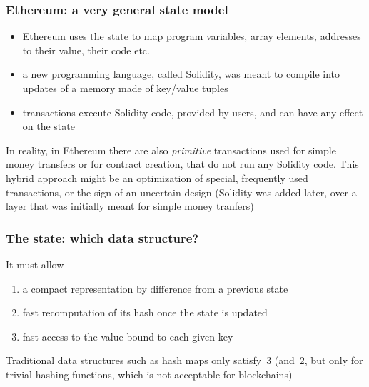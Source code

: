 \documentclass[11pt]{beamer}  %
\begin{document}
\begin{frame}\frametitle{Ethereum: a very general state model}
  \begin{itemize}
  \item Ethereum uses the state to map program variables, array elements,
    addresses to their value, their code etc.
  \item a new programming language, called Solidity, was meant to compile into
    updates of a memory made of key/value tuples
  \item transactions execute Solidity code, provided by users, and can
    have any effect on the state
  \end{itemize}

  \begin{redbox}{}
    In reality, in Ethereum there are also \emph{primitive}
    transactions used for simple money transfers or for contract
    creation, that do not run any Solidity code. This hybrid
    approach might be
    an optimization of special, frequently used transactions,
    or the sign of an uncertain design (Solidity was added later,
    over a layer that was initially meant for simple money tranfers)
  \end{redbox}

\end{frame}

\begin{frame}\frametitle{The state: which data structure?}
  It must allow
  \begin{enumerate}
  \item a compact representation by difference from a previous state
  \item fast recomputation of its hash once the state is updated
  \item fast access to the value bound to each given key
  \end{enumerate}

  \medskip
  Traditional data structures such as hash maps only satisfy~3
  (and~2, but only for trivial hashing functions, which is not
  acceptable for blockchains)

\end{frame}
\end{document}
